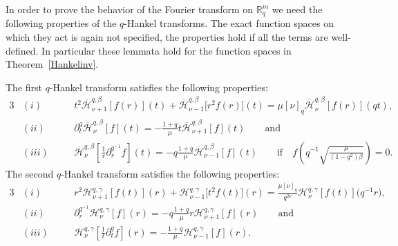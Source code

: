 \documentclass[pdftex]{sigma}
\newcommand{\mR}{\mathbb{R}}
\newcommand{\cH}{\mathcal{H}}
\numberwithin{equation}{section}
\begin{document}
In order to prove the behavior of the Fourier transform on $\mR^m_q$ we need the following properties of the $q$-Hankel transforms. The exact function spaces on which they act is again not specif\/ied, the properties hold if all the terms are well-def\/ined. In particular these lemmata hold for the function spaces in Theorem~\ref{Hankelinv}.

\begin{lemma}
\label{eigHankF}
The first $q$-Hankel transform satisfies the following properties:
\begin{alignat*}{3}
& (i)& & t^2\overline{\cH}^{q,\beta}_{\nu+1}[f(r)](t)+\overline{\cH}^{q,\beta}_{\nu-1}\big[r^2f(r)\big](t)=\mu[\nu]_q\overline{\cH}_{\nu}^{q,\beta}[f(r)](qt),& \\
& (ii)& &  \partial_t^q\overline{\cH}_{\nu}^{q,\beta}[f](t)=-\frac{1+q}{\mu}t\overline{\cH}_{\nu+1}^{q,\beta}[f](t)\qquad \mbox{and}& \\
& (iii) \quad & & \overline{\cH}_\nu^{q,\beta}\left[\frac{1}{r}\partial_r^{q^{-1}}f\right](t)=-q\frac{1+q}{\mu}\overline{\cH}_{\nu-1}^{q,\beta}[f](t)
\qquad\mbox{if}\quad f\left(q^{-1}\sqrt{\frac{\mu}{(1-q^2)\beta}}\right)=0.&
\end{alignat*}
The second $q$-Hankel transform satisfies the following properties:
\begin{alignat*}{3}
& (i)& &  r^2\cH^{q,\gamma}_{\nu+1}[f(t)](r)+\cH^{q,\gamma}_{\nu-1}\big[t^2f(t)\big](r)
=\frac{\mu[\nu]_q}{q^{2\nu}}\cH_{\nu}^{q,\gamma}[f(t)]\big(q^{-1}r\big),\\
& (ii)& & \partial_r^{q^{-1}}\cH_{\nu}^{q,\gamma}[f](r)=-q\frac{1+q}{\mu}r\cH_{\nu+1}^{q,\gamma}[f](r)\qquad \mbox{and}& \\
& (iii)\quad & & \cH_\nu^{q,\gamma}\left[\frac{1}{t}\partial_t^{q}f\right](r)=-\frac{1+q}{\mu}\cH_{\nu-1}^{q,\gamma}[f](r).
\end{alignat*}
\end{lemma}
\end{document}
